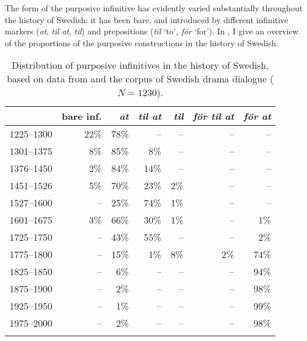 \documentclass[output=paper]{langscibook}
\begin{document}
\begin{sloppypar}
The form of the purposive infinitive has evidently varied substantially throughout the history of Swedish: it has been bare, and introduced by different infinitive markers (\textit{at}, \textit{til at}, \textit{til}) and prepositions (\textit{til} ‘to’\textit{, för} ‘for’). In , I give an overview of the proportions of the purposive constructions in the history of Swedish. 
\end{sloppypar}


\begin{table}
\caption{Distribution of purposive infinitives in the history of Swedish, based on data from \citet{Kalm2016Satsekvivalenta} and the corpus of Swedish drama dialogue ($N = 1230$).\label{tab:kalm:2}}
\begin{tabular}{lrrrrrr} 
\lsptoprule
& bare inf. & \textit{at}  & \textit{til at}  & \textit{til}  & \textit{för til at}  & \textit{för at} \\\midrule
1225–1300 & 22\% & 78\% & – & – & – & –\\
1301–1375 & 8\% & 85\% & 8\% & – & – & –\\
1376–1450 & 2\% & 84\% & 14\% & – & – & –\\
1451–1526 & 5\% & 70\% & 23\% & 2\% & – & –\\
1527–1600 & – & 25\% & 74\% & 1\% & – & –\\
1601–1675 & 3\% & 66\% & 30\% & 1\% & – & 1\%\\
1725–1750 & – & 43\% & 55\% & – & – & 2\%\\
1775–1800 & – & 15\% & 1\% & 8\% & 2\% & 74\%\\
1825–1850 & – & 6\% & – & – & – & 94\%\\
1875–1900 & – & 2\% & – & – & – & 98\%\\
1925–1950 & – & 1\% & – & – & – & 99\%\\
1975–2000 & – & 2\% & – & – & – & 98\%\\
\lspbottomrule
\end{tabular}
\end{table}
\end{document}
